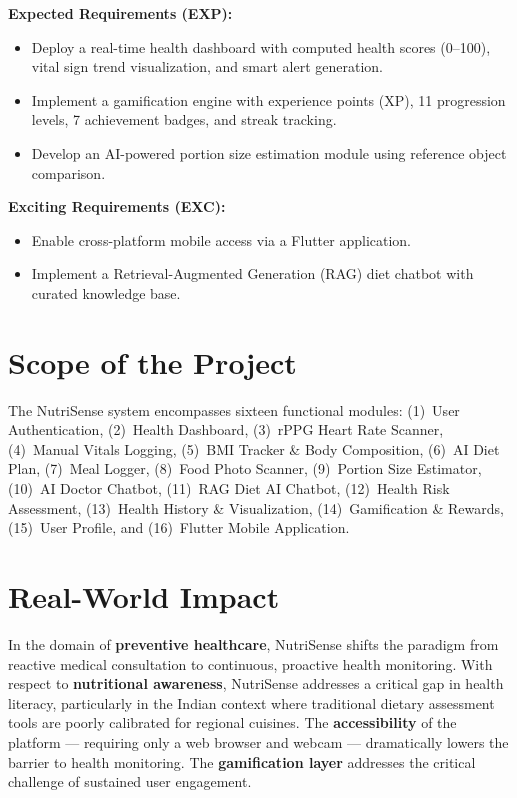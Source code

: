 \documentclass[12pt,a4paper]{report}
\begin{document}
\textbf{Expected Requirements (EXP):}
\begin{itemize}[leftmargin=2cm]
  \item[\textbf{EXP1:}] Deploy a real-time health dashboard with computed health scores (0--100), vital sign trend visualization, and smart alert generation.
  \item[\textbf{EXP2:}] Implement a gamification engine with experience points (XP), 11 progression levels, 7 achievement badges, and streak tracking.
  \item[\textbf{EXP3:}] Develop an AI-powered portion size estimation module using reference object comparison.
\end{itemize}

\textbf{Exciting Requirements (EXC):}
\begin{itemize}[leftmargin=2cm]
  \item[\textbf{EXC1:}] Enable cross-platform mobile access via a Flutter application.
  \item[\textbf{EXC2:}] Implement a Retrieval-Augmented Generation (RAG) diet chatbot with curated knowledge base.
\end{itemize}

\section{Scope of the Project}
The NutriSense system encompasses sixteen functional modules: (1)~User Authentication, (2)~Health Dashboard, (3)~rPPG Heart Rate Scanner, (4)~Manual Vitals Logging, (5)~BMI Tracker \& Body Composition, (6)~AI Diet Plan, (7)~Meal Logger, (8)~Food Photo Scanner, (9)~Portion Size Estimator, (10)~AI Doctor Chatbot, (11)~RAG Diet AI Chatbot, (12)~Health Risk Assessment, (13)~Health History \& Visualization, (14)~Gamification \& Rewards, (15)~User Profile, and (16)~Flutter Mobile Application.

\section{Real-World Impact}
In the domain of \textbf{preventive healthcare}, NutriSense shifts the paradigm from reactive medical consultation to continuous, proactive health monitoring. With respect to \textbf{nutritional awareness}, NutriSense addresses a critical gap in health literacy, particularly in the Indian context where traditional dietary assessment tools are poorly calibrated for regional cuisines. The \textbf{accessibility} of the platform --- requiring only a web browser and webcam --- dramatically lowers the barrier to health monitoring. The \textbf{gamification layer} addresses the critical challenge of sustained user engagement.
\end{document}
